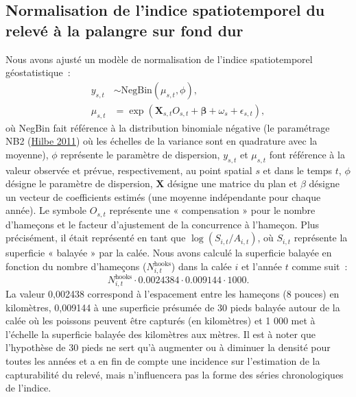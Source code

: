 \documentclass[french,11pt]{book}
\begin{document}
\hypertarget{sec:hbll-spatiotemporal}{%
\subsection{Normalisation de l'indice spatiotemporel du relevé à la palangre sur fond dur}\label{sec:hbll-spatiotemporal}}

Nous avons ajusté un modèle de normalisation de l'indice spatiotemporel géostatistique~:
\begin{align}
  y_{s,t} &\sim \mathrm{NegBin}\left(\mu_{s,t}, \phi \right),\\
  \mu_{s,t} &= \exp \left( \bm{X}_{s,t} O_{s,t} + \bm{\beta} + \omega_s + \epsilon_{s,t} \right),
\label{eq:hbll-model}
\end{align}
où NegBin fait référence à la distribution binomiale négative (le paramétrage NB2 (\protect\hyperlink{ref-hilbe2011}{Hilbe 2011}) où les échelles de la variance sont en quadrature avec la moyenne), \(\phi\) représente le paramètre de dispersion, \(y_{s,t}\) et \(\mu_{s,t}\) font référence à la valeur observée et prévue, respectivement, au point spatial \(s\) et dans le temps \(t\), \(\phi\) désigne le paramètre de dispersion, \(\bm{X}\) désigne une matrice du plan et \(\beta\) désigne un vecteur de coefficients estimés (une moyenne indépendante pour chaque année). Le symbole \(O_{s,t}\) représente une « compensation » pour le nombre d'hameçons et le facteur d'ajustement de la concurrence à l'hameçon. Plus précisément, il était représenté en tant que \(\log \left(S_{i,t} / A_{i,t} \right)\), où \(S_{i,t}\) représente la superficie « balayée » par la calée. Nous avons calculé la superficie balayée en fonction du nombre d'hameçons (\(N^\textrm{hooks}_{i,t}\)) dans la calée \(i\) et l'année \(t\) comme suit~:
\begin{equation}
N^\textrm{hooks}_{i,t} \cdot 0.0024384 \cdot 0.009144 \cdot 1000.
\end{equation}
La valeur 0,002438 correspond à l'espacement entre les hameçons (8 pouces) en kilomètres, 0,009144 à une superficie présumée de 30 pieds balayée autour de la calée où les poissons peuvent être capturés (en kilomètres) et 1 000 met à l'échelle la superficie balayée des kilomètres aux mètres. Il est à noter que l'hypothèse de 30 pieds ne sert qu'à augmenter ou à diminuer la densité pour toutes les années et a en fin de compte une incidence sur l'estimation de la capturabilité du relevé, mais n'influencera pas la forme des séries chronologiques de l'indice.
\end{document}

